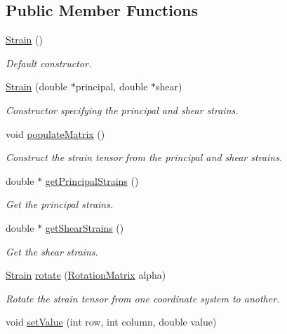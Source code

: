 \subsection*{Public Member Functions}
\begin{DoxyCompactItemize}
\item 
\hyperlink{classStrain_ad7580e057dd173ba4a4609f4edfe6e38}{Strain} ()
\begin{DoxyCompactList}\small\item\em Default constructor. \end{DoxyCompactList}\item 
\hyperlink{classStrain_a808b5a0e273cc87e19138f3be221fe53}{Strain} (double $\ast$principal, double $\ast$shear)
\begin{DoxyCompactList}\small\item\em Constructor specifying the principal and shear strains. \end{DoxyCompactList}\item 
void \hyperlink{classStrain_a53d0c01b18a8c70da97ad4aaeb924f14}{populate\-Matrix} ()
\begin{DoxyCompactList}\small\item\em Construct the strain tensor from the principal and shear strains. \end{DoxyCompactList}\item 
double $\ast$ \hyperlink{classStrain_ad76c72271c32b27122c7fa86376edea3}{get\-Principal\-Strains} ()
\begin{DoxyCompactList}\small\item\em Get the principal strains. \end{DoxyCompactList}\item 
double $\ast$ \hyperlink{classStrain_acaeb9039234c4adf356668490098db56}{get\-Shear\-Strains} ()
\begin{DoxyCompactList}\small\item\em Get the shear strains. \end{DoxyCompactList}\item 
\hyperlink{classStrain}{Strain} \hyperlink{classStrain_a39acbb854eea7868d2b88c6106e80d18}{rotate} (\hyperlink{classRotationMatrix}{Rotation\-Matrix} alpha)
\begin{DoxyCompactList}\small\item\em Rotate the strain tensor from one coordinate system to another. \end{DoxyCompactList}\item 
void \hyperlink{classMatrix33_a6cdcec77fd089b2e73ad7ae85ecff30b}{set\-Value} (int row, int column, double value)

\end{DoxyCompactItemize}
